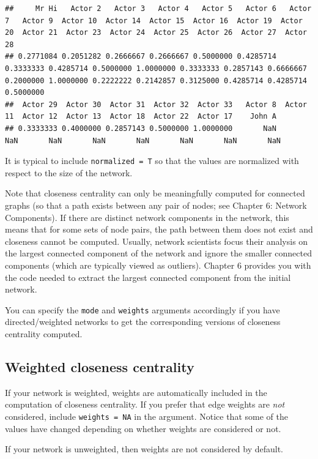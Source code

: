 \documentclass[
]{book}
\begin{document}
\begin{verbatim}
##     Mr Hi   Actor 2   Actor 3   Actor 4   Actor 5   Actor 6   Actor 7   Actor 9  Actor 10  Actor 14  Actor 15  Actor 16  Actor 19  Actor 20  Actor 21  Actor 23  Actor 24  Actor 25  Actor 26  Actor 27  Actor 28 
## 0.2771084 0.2051282 0.2666667 0.2666667 0.5000000 0.4285714 0.3333333 0.4285714 0.5000000 1.0000000 0.3333333 0.2857143 0.6666667 0.2000000 1.0000000 0.2222222 0.2142857 0.3125000 0.4285714 0.4285714 0.5000000 
##  Actor 29  Actor 30  Actor 31  Actor 32  Actor 33   Actor 8  Actor 11  Actor 12  Actor 13  Actor 18  Actor 22  Actor 17    John A 
## 0.3333333 0.4000000 0.2857143 0.5000000 1.0000000       NaN       NaN       NaN       NaN       NaN       NaN       NaN       NaN
\end{verbatim}

It is typical to include \texttt{normalized\ =\ T} so that the values are normalized with respect to the size of the network.

Note that closeness centrality can only be meaningfully computed for connected graphs (so that a path exists between any pair of nodes; see Chapter 6: Network Components). If there are distinct network components in the network, this means that for some sets of node pairs, the path between them does not exist and closeness cannot be computed. Usually, network scientists focus their analysis on the largest connected component of the network and ignore the smaller connected components (which are typically viewed as outliers). Chapter 6 provides you with the code needed to extract the largest connected component from the initial network.

You can specify the \texttt{mode} and \texttt{weights} arguments accordingly if you have directed/weighted networks to get the corresponding versions of closeness centrality computed.

\subsection{Weighted closeness centrality}\label{weighted-closeness-centrality}

If your network is weighted, weights are automatically included in the computation of closeness centrality. If you prefer that edge weights are \emph{not} considered, include \texttt{weights\ =\ NA} in the argument. Notice that some of the values have changed depending on whether weights are considered or not.

If your network is unweighted, then weights are not considered by default.
\end{document}
